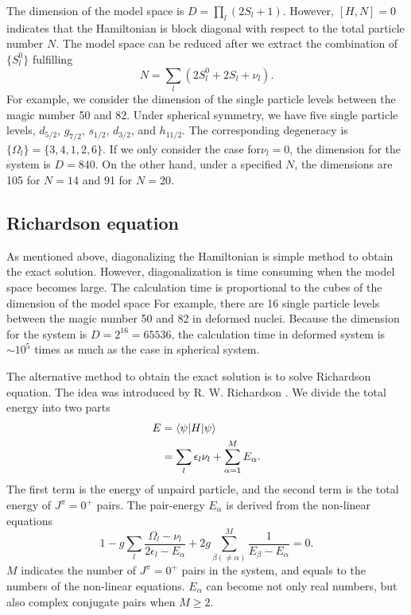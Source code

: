 \documentclass[11pt]{book} %
\begin{document}
The dimension of the model space is $D=\prod_l(2S_l+1)$. However, $[H,N]=0$ indicates that the Hamiltonian is block diagonal with respect to the total particle number $N$. The model space can be reduced after we extract the combination of $\{S_l^0\}$ fulfilling
\begin{equation}
  N = \sum_l (2S_l^0+2S_l+\nu_l) .
\end{equation} 
For example, we consider the dimension of the single particle levels between the magic number 50 and 82. Under spherical symmetry, we have five single particle levels, $d_{5/2}$, $g_{7/2}$, $s_{1/2}$, $d_{3/2}$, and $h_{11/2}$. The corresponding degeneracy is $\{\Omega_l\}=\{3,4,1,2,6\}$. If we only consider the case for$\nu_l=0$, the dimension for the system is $D=840$. On the other hand, under a specified $N$, the dimensions are 105 for $N=14$ and 91 for $N=20$.

\subsection{Richardson equation}
As mentioned above, diagonalizing the Hamiltonian is simple method to obtain the exact solution.
However, diagonalization is time consuming when the model space becomes large. The calculation time is proportional to the cubes of the dimension of the model space For example, there are 16 single particle levels between the magic number 50 and 82 in deformed nuclei. Because the dimension for the system is $D=2^{16}=65536$, the calculation time in deformed system is $\sim 10^5$ times as much as the case in spherical system. \par
The alternative method to obtain the exact solution is to solve Richardson equation. The idea was introduced by R. W. Richardson \cite{Richardson1, Richardson2, Richardson3}. We divide the total energy into two parts
\begin{align}
  E &= \braket{\psi|H|\psi} \\
  &= \sum_l \epsilon_l \nu_l + \sum_{\alpha=1}^M E_{\alpha} .
\end{align}
The first term is the energy of unpaird particle, and the second term is the total energy of $J^{\pi}=0^+$ pairs. The pair-energy $E_{\alpha}$ is derived from the non-linear equations
\begin{equation}
  1 - g\sum_l \frac{\Omega_l-\nu_l}{2\epsilon_l-E_{\alpha}} + 2g\sum_{\beta(\neq\alpha)}^M \frac{1}{E_{\beta}-E_{\alpha}} = 0 .
\end{equation}
$M$ indicates the number of $J^{\pi}=0^+$ pairs in the system, and equals to the numbers of the non-linear equations. $E_{\alpha}$ can become not only real numbers, but also complex conjugate pairs when $M\ge 2$. 
\end{document}
